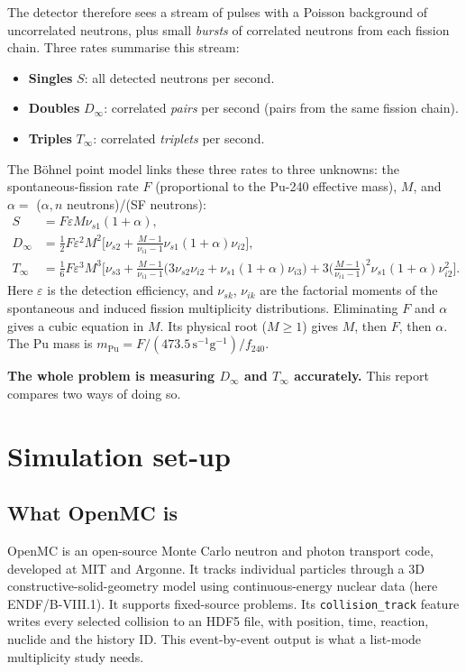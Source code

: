 \documentclass[11pt,a4paper]{article}
\newcommand{\Dinf}{D_\infty}
\newcommand{\Tinf}{T_\infty}
\begin{document}
The detector therefore sees a stream of pulses with a Poisson background of uncorrelated
neutrons, plus small \emph{bursts} of correlated neutrons from each fission chain. Three
rates summarise this stream:
\begin{itemize}
  \item \textbf{Singles} $S$: all detected neutrons per second.
  \item \textbf{Doubles} $\Dinf$: correlated \emph{pairs} per second (pairs from the same fission chain).
  \item \textbf{Triples} $\Tinf$: correlated \emph{triplets} per second.
\end{itemize}
The Böhnel point model links these three rates to three unknowns: the spontaneous-fission
rate $F$ (proportional to the Pu-240 effective mass), $M$, and
$\alpha=$ ($\alpha,n$ neutrons)/(SF neutrons):
\begin{align}
S &= F\varepsilon M\nu_{s1}(1+\alpha), \label{eq:S}\\
\Dinf &= \tfrac{1}{2}F\varepsilon^2M^2\Big[\nu_{s2}+\tfrac{M-1}{\nu_{i1}-1}\nu_{s1}(1+\alpha)\nu_{i2}\Big],\\
\Tinf &= \tfrac{1}{6}F\varepsilon^3M^3\Big[\nu_{s3}+\tfrac{M-1}{\nu_{i1}-1}\big(3\nu_{s2}\nu_{i2}+\nu_{s1}(1+\alpha)\nu_{i3}\big)
        +3\big(\tfrac{M-1}{\nu_{i1}-1}\big)^2\nu_{s1}(1+\alpha)\nu_{i2}^2\Big].
\end{align}
Here $\varepsilon$ is the detection efficiency, and $\nu_{sk}$, $\nu_{ik}$ are the factorial
moments of the spontaneous and induced fission multiplicity distributions. Eliminating $F$
and $\alpha$ gives a cubic equation in $M$. Its physical root ($M\ge1$) gives $M$, then
$F$, then $\alpha$. The Pu mass is $m_{\text{Pu}}=F/(473.5\,\text{s}^{-1}\text{g}^{-1})/f_{240}$.

\textbf{The whole problem is measuring $\Dinf$ and $\Tinf$ accurately.} This report compares
two ways of doing so.

\section{Simulation set-up}
\subsection{What OpenMC is}
OpenMC is an open-source Monte Carlo neutron and photon transport code, developed at MIT
and Argonne. It tracks individual particles through a 3D constructive-solid-geometry model
using continuous-energy nuclear data (here ENDF/B-VIII.1). It supports fixed-source
problems. Its \texttt{collision\_track} feature writes every selected collision to an HDF5
file, with position, time, reaction, nuclide and the history ID. This event-by-event output
is what a list-mode multiplicity study needs.
\end{document}

